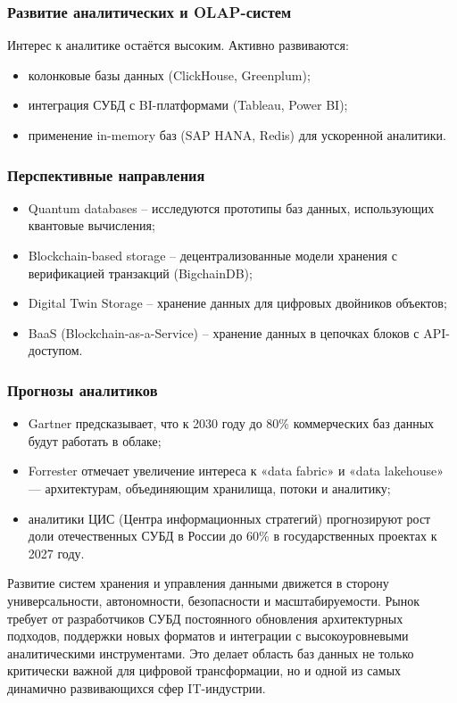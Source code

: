 \subsubsection{Развитие аналитических и OLAP-систем}

Интерес к аналитике остаётся высоким. Активно развиваются:
\begin{itemize}
	\item колонковые базы данных (ClickHouse, Greenplum);
	\item интеграция СУБД с BI-платформами (Tableau, Power BI);
	\item применение in-memory баз (SAP HANA, Redis) для ускоренной аналитики.
\end{itemize}

\subsubsection{Перспективные направления}

\begin{itemize}
	\item Quantum databases -- исследуются прототипы баз данных, использующих квантовые вычисления;
	\item Blockchain-based storage -- децентрализованные модели хранения с верификацией транзакций (BigchainDB);
	\item Digital Twin Storage -- хранение данных для цифровых двойников объектов;
	\item BaaS (Blockchain-as-a-Service) -- хранение данных в цепочках блоков с API-доступом.	
\end{itemize}

\subsubsection{Прогнозы аналитиков}

\begin{itemize}
	\item Gartner предсказывает, что к 2030 году до 80\% коммерческих баз данных будут работать в облаке;
	\item Forrester отмечает увеличение интереса к «data fabric» и «data lakehouse» — архитектурам, объединяющим хранилища, потоки и аналитику;
	\item аналитики ЦИС (Центра информационных стратегий) прогнозируют рост доли отечественных СУБД в России до 60\% в государственных проектах к 2027 году.	
\end{itemize}

Развитие систем хранения и управления данными движется в сторону универсальности, автономности, безопасности и масштабируемости. Рынок требует от разработчиков СУБД постоянного обновления архитектурных подходов, поддержки новых форматов и интеграции с высокоуровневыми аналитическими инструментами. Это делает область баз данных не только критически важной для цифровой трансформации, но и одной из самых динамично развивающихся сфер IT-индустрии.